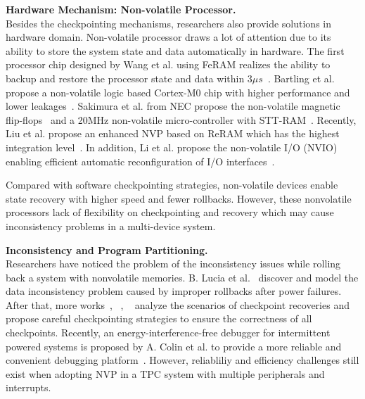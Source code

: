 \vspace{5pt}
\noindent\textbf{Hardware Mechanism: Non-volatile Processor.} \\
%
Besides the checkpointing mechanisms, researchers also provide solutions in hardware domain.
Non-volatile processor draws a lot of attention due to its ability to store the system state and data automatically in hardware.
The first processor chip designed by Wang et al. using FeRAM realizes the ability to backup and restore the processor state and data within $3\mu s$~\cite{wang20123us}.
Bartling et al. propose a non-volatile logic based Cortex-M0 chip with higher performance and lower leakages~\cite{Bartling2013An}.
Sakimura et al. from NEC propose the non-volatile magnetic flip-flops~\cite{Sakimura2009Nonvolatile} and a 20MHz non-volatile micro-controller with STT-RAM~\cite{Sakimura201410}.
Recently, Liu et al. propose an enhanced NVP based on ReRAM which has the highest integration level~\cite{Liu2016a}.
In addition, Li et al. propose the non-volatile I/O (NVIO) enabling efficient automatic reconfiguration of  I/O interfaces~\cite{li2016hw}.

Compared with software checkpointing strategies, non-volatile devices enable state recovery with higher speed and fewer rollbacks.
However, these nonvolatile processors lack of flexibility on checkpointing and recovery which may cause inconsistency problems in a multi-device system.


\vspace{5pt}
\noindent\textbf{Inconsistency and Program Partitioning.} \\
%
Researchers have noticed the problem of the inconsistency issues while rolling back a system with nonvolatile memories.
B. Lucia et al.~\cite{Lucia2015} discover and model the data inconsistency problem caused by improper rollbacks after power failures.
After that, more works~\cite{van2016intermittent}, ~\cite{colin2016chain}, ~\cite{Xie2015} analyze the scenarios of checkpoint recoveries and propose careful checkpointing strategies to ensure the correctness of all checkpoints.
Recently, an energy-interference-free debugger for intermittent powered systems is proposed by A. Colin et al. to provide a more reliable and convenient debugging platform~\cite{Colin2016An}.
However, reliabliliy and efficiency challenges still exist when adopting NVP in a TPC system with multiple peripherals and interrupts.

